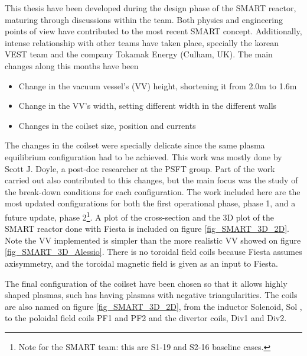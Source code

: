\documentclass[a4paper,12pt,oneside]{book}
\begin{document}
% 
 This thesis have been developed during the design phase of the SMART reactor, maturing through discussions within the team. Both physics and engineering points of view have contributed to the most recent SMART concept. Additionally, intense relationship with other teams have taken place, specially the korean VEST team and the company Tokamak Energy (Culham, UK).
%
The main changes along this months have been
%
\begin{itemize}
\item Change in the vacuum vessel's (VV) height, shortening it from 2.0m to 1.6m
\item Change in the VV's width, setting different width in the  different walls
\item Changes in the coilset size, position and currents
\end{itemize}
The changes in the coilset were specially delicate since the same plasma equilibrium configuration had to be achieved. This work was mostly done by Scott J. Doyle, a post-doc researcher at the PSFT group. Part of the work carried out also contributed to this changes, but the main focus was the study of the break-down conditions for each configuration. The work included here are the most updated configurations for both the first operational phase, phase 1, and a future update, phase 2\footnote{Note for the SMART team: this are S1-19 and S2-16 baseline cases.}. A plot of the cross-section and the 3D plot of the SMART reactor done with Fiesta is included on figure \ref{fig_SMART_3D_2D}. Note the VV implemented is simpler than the more realistic VV showed on figure \ref{fig_SMART_3D_Alessio}. There is no toroidal field coils because Fiesta assumes axisymmetry, and the toroidal magnetic field is given as an input to Fiesta.

The final configuration of the coilset have been chosen so that it allows highly shaped plasmas, such has having plasmas with negative triangularities. The coils are also named on figure \ref{fig_SMART_3D_2D}, from the inductor Solenoid, Sol , to the poloidal field coils PF1 and PF2 and the divertor coils, Div1 and Div2.
\end{document}
